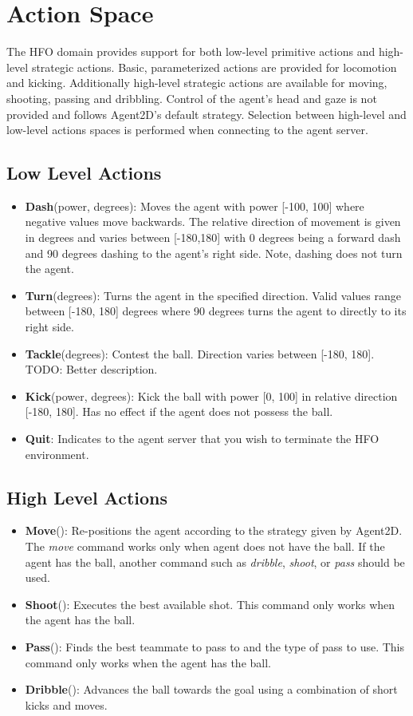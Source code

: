 \documentclass[12pt]{article}
\begin{document}
\section{Action Space}
The HFO domain provides support for both low-level primitive actions
and high-level strategic actions. Basic, parameterized actions are
provided for locomotion and kicking. Additionally high-level strategic
actions are available for moving, shooting, passing and
dribbling. Control of the agent's head and gaze is not provided and
follows Agent2D's default strategy. Selection between high-level and
low-level actions spaces is performed when connecting to the agent
server.

\subsection{Low Level Actions}
\begin{itemize}
\item{\textbf{Dash}(power, degrees): Moves the agent with power [-100,
    100] where negative values move backwards. The relative direction
  of movement is given in degrees and varies between [-180,180] with 0
  degrees being a forward dash and 90 degrees dashing to the agent's
  right side. Note, dashing does not turn the agent.}
\item{\textbf{Turn}(degrees): Turns the agent in the
  specified direction. Valid values range between [-180, 180] degrees
  where 90 degrees turns the agent to directly to its right side.}
\item{\textbf{Tackle}(degrees): Contest the ball. Direction
  varies between [-180, 180]. TODO: Better description.}
\item{\textbf{Kick}(power, degrees): Kick the ball with power [0, 100]
  in relative direction [-180, 180]. Has no effect if the agent does
  not possess the ball.}
\item{\textbf{Quit}: Indicates to the agent server that you wish to
  terminate the HFO environment.}
\end{itemize}

\subsection{High Level Actions}
\begin{itemize}
\item{\textbf{Move}(): Re-positions the agent according to the
  strategy given by Agent2D. The \textit{move} command works only when
  agent does not have the ball. If the agent has the ball, another
  command such as \textit{dribble}, \textit{shoot}, or \textit{pass}
  should be used.}
\item{\textbf{Shoot}(): Executes the best available shot. This command
  only works when the agent has the ball.}
\item{\textbf{Pass}(): Finds the best teammate to pass to and the type
  of pass to use. This command only works when the agent has the
  ball.}
\item{\textbf{Dribble}(): Advances the ball towards the goal using a
  combination of short kicks and moves.}
\end{itemize}



\end{document}
